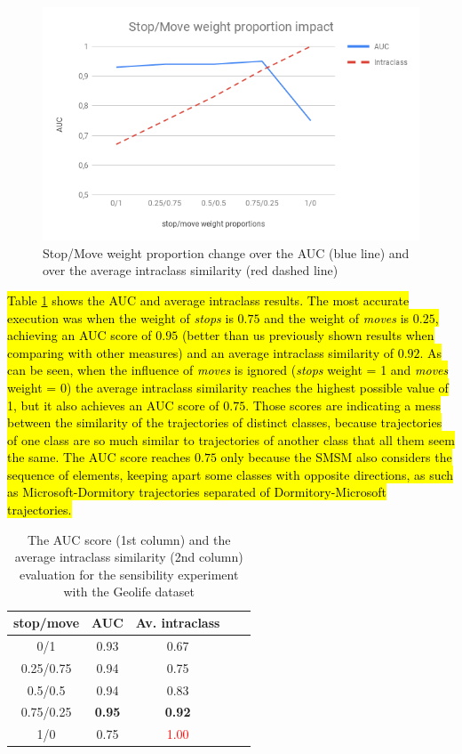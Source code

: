 \documentclass[12pt]{article}
\begin{document}
\begin{figure}[ht!]
\centerline{
\centering
\includegraphics[width=.75\textwidth]{Images/StopMove_weight_proportion_impact.png}
}
\caption{Stop/Move weight proportion change over the AUC (blue line) and over the average intraclass similarity (red dashed line)}
\label{fig:sensibility_stopmove}
\end{figure}

\hl{Table {\ref{tab:sensibility_stopmove}} shows the AUC and average intraclass results. The most accurate execution was when the weight of \emph{stops} is $0.75$ and the weight of \emph{moves} is $0.25$, achieving an AUC score of $0.95$ (better than us previously shown results when comparing with other measures) and an average intraclass similarity of $0.92$. As can be seen, when the influence of \emph{moves} is ignored (\emph{stops} weight = 1 and \emph{moves} weight = 0) the average intraclass similarity reaches the highest possible value of 1, but it also achieves an AUC score of $0.75$. Those scores are indicating a mess between the similarity of the trajectories of distinct classes, because trajectories of one class are so much similar to trajectories of another class that all them seem the same. The AUC score reaches $0.75$ only because the SMSM also considers the sequence of elements, keeping apart some classes with opposite directions, as such as Microsoft-Dormitory trajectories separated of Dormitory-Microsoft trajectories.}

\begin{table}[ht!]
  \scriptsize
  \centering
  \begin{tabular}{|c|c|c|c|c|}
  	\hline
stop/move & AUC & Av. intraclass\\
  	\hline
0/1 &0.93 & 0.67\\
0.25/0.75 & 0.94 & 0.75\\
0.5/0.5 & 0.94 & 0.83\\
0.75/0.25 & \textbf{0.95} & \textbf{0.92}\\
1/0 & 0.75 & \textcolor{red}{1.00} \\
    \hline
  \end{tabular}
  \caption{The AUC score (1st column) and the average intraclass similarity (2nd column) evaluation for the sensibility experiment with the Geolife dataset}
  \label{tab:sensibility_stopmove}
\end{table}
\end{document}
